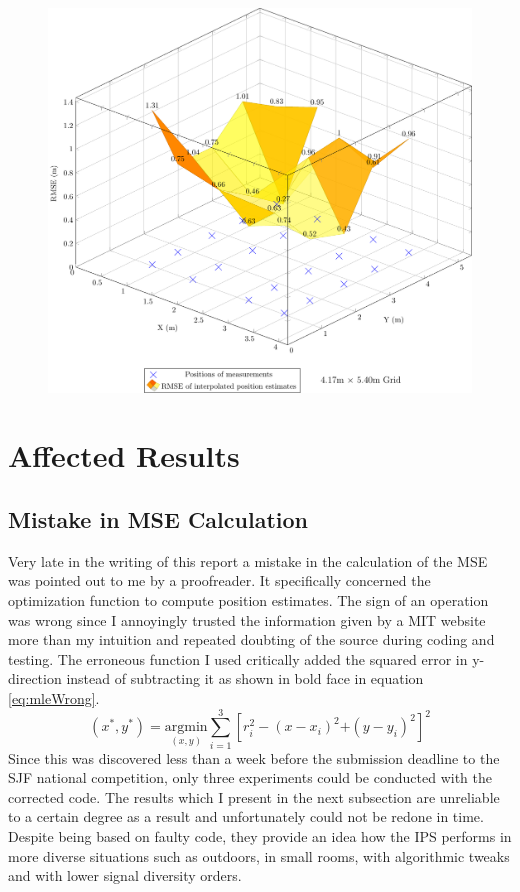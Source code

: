 \documentclass[a4paper, oneside]{ipsreport}
\begin{document}
\begin{figure}[H]
	\centering
	\includegraphics[width=0.8\linewidth]{./figures/rmse/rearrangedBeacons.pdf}
	\label{fig:rearrangedBeacons}
\end{figure}

\section{Affected Results}
\subsection{Mistake in MSE Calculation}
Very late in the writing of this report a mistake in the calculation of the MSE was pointed out to me by a proofreader. It specifically concerned the optimization function to compute position estimates. The sign of an operation was wrong since I annoyingly trusted the information given by a MIT website \cite{localizationMIT} more than my intuition and repeated doubting of the source during coding and testing. The erroneous function I used critically added the squared error in y-direction instead of subtracting it as shown in bold face in equation \ref{eq:mleWrong}.
\begin{equation}
	\label{eq:mleWrong}
	(x^*, y^*) = \underset{(x,y)}{\mathrm{argmin}}\sum_{i=1}^3 [r_i^2 - (x - x_i)^2 \textbf{+} (y - y_i)^2]^2
\end{equation}
Since this was discovered less than a week before the submission deadline to the SJF national competition, only three experiments could be conducted with the corrected code. The results which I present in the next subsection are unreliable to a certain degree as a result and unfortunately could not be redone in time. Despite being based on faulty code, they provide an idea how the IPS performs in more diverse situations such as outdoors, in small rooms, with algorithmic tweaks and with lower signal diversity orders.
\end{document}
